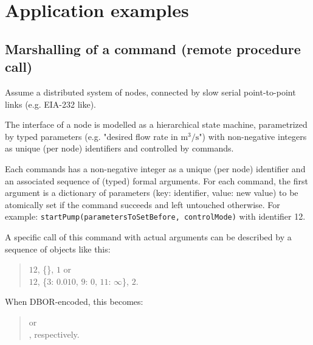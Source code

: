 
\section{Application examples}
\label{sec:applicationexamples}

\subsection{Marshalling of a command (remote procedure call)}

Assume a distributed system of nodes, connected by slow serial point-to-point links (e.g. EIA-232 like).

The interface of a node is modelled as a hierarchical state machine, parametrized by typed parameters
(e.g. "desired flow rate in $\text{m}^3/\text{s}$") with non-negative integers as unique (per node) identifiers
and controlled by commands.

Each commands has a non-negative integer as a unique (per node) identifier and an associated sequence of
(typed) formal arguments.
For each command, the first argument is a dictionary of parameters (key: identifier, value: new value) to be
atomically set if the command succeeds and left untouched otherwise.
For example: \texttt{startPump(parametersToSetBefore, controlMode)} with identifier 12.

\medskip
\begin{BeginParPenalty}
    A specific call of this command with actual arguments can be described by a sequence of objects like this:
    \begin{quote}
        $12$, \{\}, $1$ or \\
        $12$, \{$3$: $0.010$, $9$: $0$, $11$: $\infty$\}, $2$.
    \end{quote}
\end{BeginParPenalty}

\begin{BeginParPenalty}
    When DBOR-encoded, this becomes:
    \begin{quote}
        or \\
        \ByteSequence{
            \DborFirstByteHex{Number}{0C},
            \DborFirstByteHex{Dictionary}{A7}, %
                \DborFirstByteHex{Number}{03},
                \DborFirstByteHex{Number}{E9}, \DborNextByteHex{01},
                \DborFirstByteHex{Number}{09},
                \DborFirstByteHex{Number}{00},
                \DborFirstByteHex{Number}{0B},
                \DborFirstByteHex{Numberlike}{FE},
            \DborFirstByteHex{Number}{02}
        }, respectively.
    \end{quote}
\end{BeginParPenalty}


